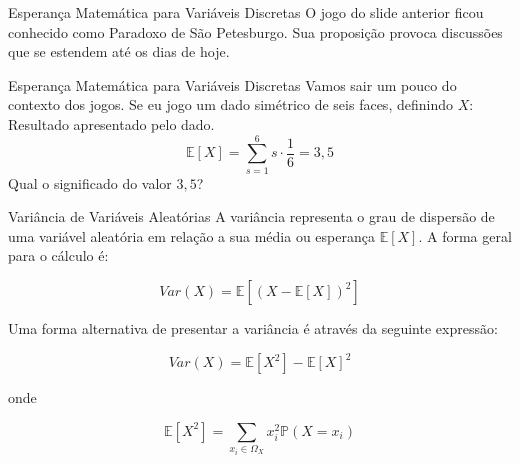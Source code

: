 \begin{frame}{Esperança Matemática para Variáveis Discretas }
    O jogo do slide anterior ficou conhecido como Paradoxo de São Petesburgo. Sua proposição provoca discussões que se estendem até os dias de hoje. 
\end{frame}

\begin{frame}{Esperança Matemática para Variáveis Discretas }
    Vamos sair um pouco do contexto dos jogos. Se eu jogo um dado simétrico de seis faces, 
    definindo $X:$ Resultado apresentado pelo dado. 
\pause
    $$\mathds{E}[X] = \sum_{s=1}^{6} s \cdot \frac{1}{6} = 3,5$$
\pause
Qual o significado do valor $3,5$?
\end{frame}

\begin{frame}{Variância de Variáveis Aleatórias}
    A variância representa o grau de dispersão de uma variável aleatória em relação a sua média ou esperança $\mathbb{E}[X]$. A forma geral para o cálculo é:

    $$Var(X) = \mathbb{E}[(X - \mathbb{E}[X])^2]$$

    Uma forma alternativa de presentar a variância é através da seguinte expressão:

    $$Var(X) = \mathbb{E}[X^2] - \mathbb{E}[X]^2$$

    onde

     $$\mathbb{E}[X^2] = \sum_{x_i \in \Omega_X} x_i^2 \mathds{P}(X=x_i)$$
\end{frame}


    

